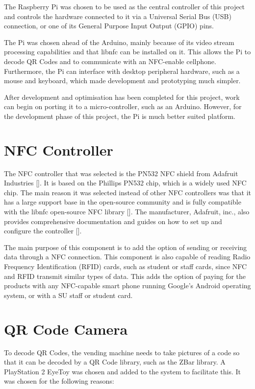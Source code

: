 The Raspberry Pi was chosen to be used as the central controller of this project and
controls the hardware connected to it via a Universal Serial Bus (USB) connection, or one of
its General Purpose Input Output (GPIO) pins.

The Pi was chosen ahead of the Arduino, mainly because of its video stream processing capabilities 
and that libnfc can be installed on it. This allows the Pi to decode QR Codes and to communicate with 
an NFC-enable cellphone. Furthermore, the Pi can interface with desktop peripheral hardware, such as a mouse and
keyboard, which made development and prototyping much simpler.

After development and optimisation has been completed for this project, work can begin on porting it to 
a micro-controller, such as an Arduino. However, for the development phase of this project,
 the Pi is much better suited platform.

\section{NFC Controller}
\label{sec:nfc-controller}

The NFC controller that was selected is the PN532 NFC shield from Adafruit Industries
[\cite{website:adafruit-nfc}]. It is based on
the Phillips PN532 chip, which is a widely used NFC chip. The main reason it was selected instead
of other NFC controllers was that it has a large support base in the open-source
community and is fully compatible with the libnfc open-source NFC library
[\cite{website:libnfc-hardware}]. The manufacturer, Adafruit, inc., also provides
comprehensive documentation and guides on how to set up and configure the controller
[\cite{website:adafruit-tutorial}].
 
The main purpose of this component is to add the option of sending or receiving data
through a NFC connection.
This component is also capable of reading Radio Frequency Identification (RFID)
cards, such as student or staff cards, since NFC and RFID transmit similar types of data. This adds the option of paying for the products with 
any NFC-capable smart phone running Google's Android operating system, or with a SU staff or
student card.

\section{QR Code Camera}
\label{sec:webcam}

To decode QR Codes, the vending machine needs to take pictures of a code so that it can be
decoded by a QR Code library, such as the ZBar library. A PlayStation 2 EyeToy was
chosen and added to the system to facilitate this. It was chosen for the following reasons:

